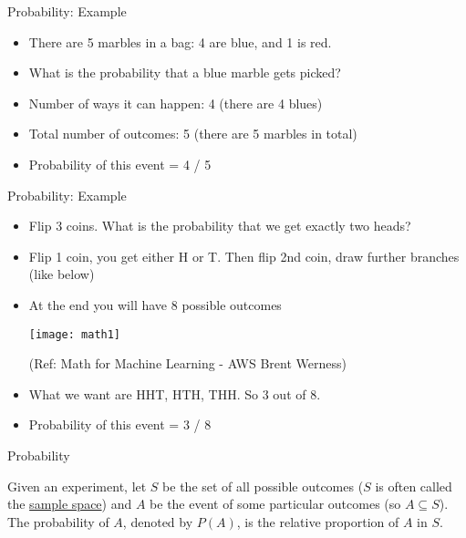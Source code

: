 \begin{frame}{Probability: Example}
\begin{itemize}
\item There are 5 marbles in a bag: 4 are blue, and 1 is red. 
\item What is the probability that a blue marble gets picked? 
\item Number of ways it can happen: 4 (there are 4 blues) 
\item Total number of outcomes: 5 (there are 5 marbles in total) 
 
\item Probability of  this event  = 4 / 5 
\end{itemize}
\end{frame}

\begin{frame}{Probability: Example}
\begin{itemize}
\item Flip 3 coins. What is the probability that we get exactly two heads?
\item Flip 1 coin, you get either H or T. Then flip 2nd coin, draw further branches (like below)
\item At the end you will have 8 possible outcomes
\begin{center}
\texttt{[image: math1]}
\end{center}

\tiny{(Ref: Math for Machine Learning - AWS Brent Werness)}

\item What we want are HHT, HTH, THH. So 3 out of 8. 
\item Probability of  this event  = 3 / 8

\end{itemize}


\end{frame}


\begin{frame}{Probability} 
\begin{definition}
Given an experiment, let $S$ be the set of all possible outcomes ($S$ is often called the \underline{sample space}) and $A$ be the event of some particular outcomes (so $A\subseteq S$).  The probability of $A$, denoted by $P(A)$, is the relative proportion of $A$ in $S$.
\end{definition}

\end{frame}

